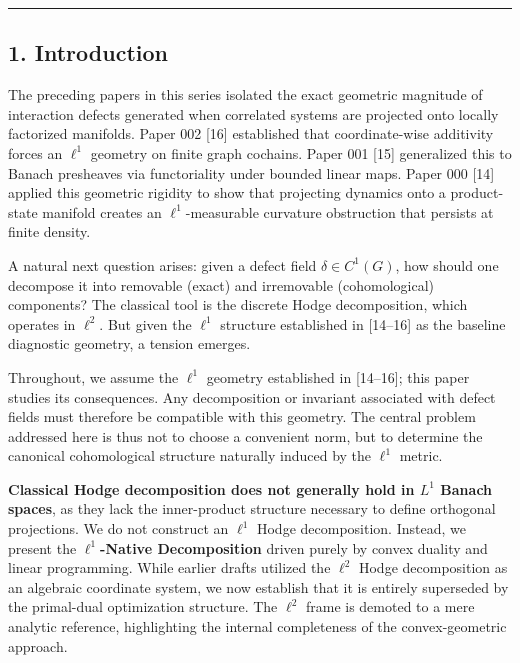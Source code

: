 \documentclass[
]{article}
\begin{document}
\begin{center}\rule{0.5\linewidth}{0.5pt}\end{center}

\subsection{1. Introduction}\label{introduction}

The preceding papers in this series isolated the exact geometric
magnitude of interaction defects generated when correlated systems are
projected onto locally factorized manifolds. Paper 002 {[}16{]}
established that coordinate-wise additivity forces an \(\ell^1\)
geometry on finite graph cochains. Paper 001 {[}15{]} generalized this
to Banach presheaves via functoriality under bounded linear maps. Paper
000 {[}14{]} applied this geometric rigidity to show that projecting
dynamics onto a product-state manifold creates an \(\ell^1\)-measurable
curvature obstruction that persists at finite density.

A natural next question arises: given a defect field
\(\delta \in C^1(G)\), how should one decompose it into removable
(exact) and irremovable (cohomological) components? The classical tool
is the discrete Hodge decomposition, which operates in \(\ell^2\). But
given the \(\ell^1\) structure established in {[}14--16{]} as the
baseline diagnostic geometry, a tension emerges.

Throughout, we assume the \(\ell^1\) geometry established in
{[}14--16{]}; this paper studies its consequences. Any decomposition or
invariant associated with defect fields must therefore be compatible
with this geometry. The central problem addressed here is thus not to
choose a convenient norm, but to determine the canonical cohomological
structure naturally induced by the \(\ell^1\) metric.

\textbf{Classical Hodge decomposition does not generally hold in \(L^1\)
Banach spaces}, as they lack the inner-product structure necessary to
define orthogonal projections. We do not construct an \(\ell^1\) Hodge
decomposition. Instead, we present the \textbf{\(\ell^1\)-Native
Decomposition} driven purely by convex duality and linear programming.
While earlier drafts utilized the \(\ell^2\) Hodge decomposition as an
algebraic coordinate system, we now establish that it is entirely
superseded by the primal-dual optimization structure. The \(\ell^2\)
frame is demoted to a mere analytic reference, highlighting the internal
completeness of the convex-geometric approach.
\end{document}
